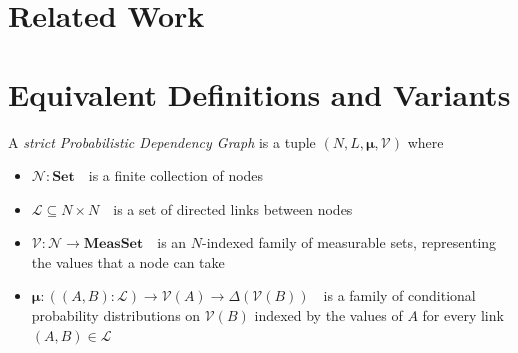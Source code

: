 \documentclass{article}
\newcommand{\modelname}{Probabilistic Dependency Graph}
\newcommand\Set{\textbf{Set}}
\newcommand\MeasSet{\textbf{MeasSet}}
\newcommand\bmu{\boldsymbol{\mu}}
\begin{document}


	
	\section{Related Work}




	\section{Equivalent Definitions and Variants}


	\begin{defn}\label{def:model}
		A \emph{strict \modelname} is a tuple $(N, L, \bmu, \mathcal V)$ where
		\begin{itemize}[nosep]
			\item $\mathcal N : \Set$~~is a finite collection of nodes
			\item $\mathcal L \subseteq N \times N$~~is a set of directed links between nodes
			\item $\mathcal V : \mathcal N \to \MeasSet $~~is an $N$-indexed family of measurable sets, representing the values that a node can take
			\item $\bmu: ((A,B): \mathcal L) \to \mathcal V(A) \to \Delta(\mathcal{V}(B))$~~is a family of conditional probability distributions on $\mathcal V(B)$ indexed by the values of $A$ for every link $(A,B) \in \mathcal L$ %

		\end{itemize}
	\end{defn}
\end{document}
